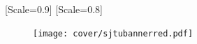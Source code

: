 
[Scale=0.9]
[Scale=0.8]
\newcommand{\hei}{\CJKfamily{hei}\selectfont}
\newcommand{\sun}{\CJKfamily{sun}\selectfont}

\begin{figure}[h]
    \centering
    \texttt{[image: cover/sjtubannerred.pdf]}
\end{figure}

\vspace*{0.5cm}

\vspace*{0.5cm}

